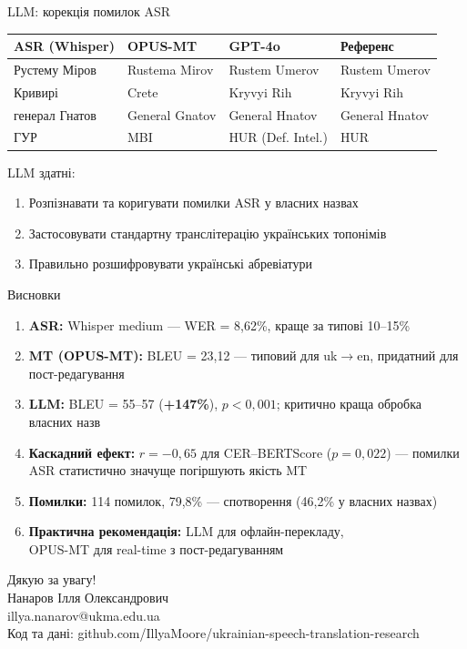 \documentclass[aspectratio=169]{beamer}
\begin{document}
\begin{frame}{LLM: корекція помилок ASR}
\begin{center}
\begin{tabular}{llll}
\toprule
\textbf{ASR (Whisper)} & \textbf{OPUS-MT} & \textbf{GPT-4o} & \textbf{Референс} \\
\midrule
Рустему Міров & Rustema Mirov & Rustem Umerov & Rustem Umerov \\
Кривирі & Crete & Kryvyi Rih & Kryvyi Rih \\
генерал Гнатов & General Gnatov & General Hnatov & General Hnatov \\
ГУР & MBI & HUR (Def. Intel.) & HUR \\
\bottomrule
\end{tabular}
\end{center}

\vspace{0.5em}
LLM здатні:
\begin{enumerate}
    \item Розпізнавати та коригувати помилки ASR у власних назвах
    \item Застосовувати стандартну транслітерацію українських топонімів
    \item Правильно розшифровувати українські абревіатури
\end{enumerate}
\end{frame}

\begin{frame}{Висновки}
\begin{enumerate}
    \item \textbf{ASR:} Whisper medium --- WER = 8,62\%, краще за типові 10--15\%

    \item \textbf{MT (OPUS-MT):} BLEU = 23,12 --- типовий для uk$\to$en, придатний для пост-редагування

    \item \textbf{LLM:} BLEU = 55--57 (\textbf{+147\%}), $p < 0,001$; критично краща обробка власних назв

    \item \textbf{Каскадний ефект:} $r = -0,65$ для CER--BERTScore ($p = 0,022$) --- помилки ASR статистично значуще погіршують якість MT

    \item \textbf{Помилки:} 114 помилок, 79,8\% --- спотворення (46,2\% у власних назвах)

    \item \textbf{Практична рекомендація:} LLM для офлайн-перекладу,\\OPUS-MT для real-time з пост-редагуванням
\end{enumerate}
\end{frame}

\begin{frame}
\begin{center}
\vspace{2cm}
{\Huge Дякую за увагу!}\\[1.5cm]
{\large Нанаров Ілля Олександрович}\\[0.5em]
{\normalsize illya.nanarov@ukma.edu.ua}\\[1em]
{\small Код та дані: github.com/IllyaMoore/ukrainian-speech-translation-research}
\end{center}
\end{frame}
\end{document}
